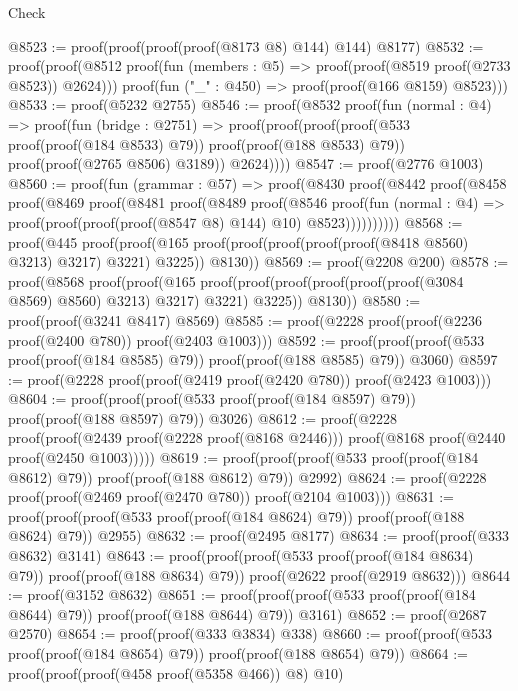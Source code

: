 \begin{lexlean}{Check}
\begin{coremodule}
@8523 := proof(proof(proof(proof(@8173 @8) @144) @144) @8177)
@8532 := proof(proof(@8512
        proof(fun (members : @5) => proof(proof(@8519 proof(@2733 @8523)) @2624)))
      proof(fun ("_" : @450) => proof(proof(@166 @8159) @8523)))
@8533 := proof(@5232 @2755)
@8546 := proof(@8532
      proof(fun (normal : @4) =>
        proof(fun (bridge : @2751) =>
          proof(proof(proof(proof(@533 proof(proof(@184 @8533) @79)) proof(proof(@188 @8533) @79))
                proof(proof(@2765 @8506) @3189))
              @2624))))
@8547 := proof(@2776 @1003)
@8560 := proof(fun (grammar : @57) =>
    proof(@8430
        proof(@8442
            proof(@8458
                proof(@8469
                    proof(@8481
                        proof(@8489
                            proof(@8546
                                proof(fun (normal : @4) =>
                                  proof(proof(proof(proof(@8547 @8) @144) @10) @8523))))))))))
@8568 := proof(@445
      proof(proof(@165 proof(proof(proof(proof(proof(@8418 @8560) @3213) @3217) @3221) @3225))
          @8130))
@8569 := proof(@2208 @200)
@8578 := proof(@8568
      proof(proof(@165
            proof(proof(proof(proof(proof(proof(@3084 @8569) @8560) @3213) @3217) @3221) @3225))
          @8130))
@8580 := proof(proof(@3241 @8417) @8569)
@8585 := proof(@2228 proof(proof(@2236 proof(@2400 @780)) proof(@2403 @1003)))
@8592 := proof(proof(proof(@533 proof(proof(@184 @8585) @79)) proof(proof(@188 @8585) @79)) @3060)
@8597 := proof(@2228 proof(proof(@2419 proof(@2420 @780)) proof(@2423 @1003)))
@8604 := proof(proof(proof(@533 proof(proof(@184 @8597) @79)) proof(proof(@188 @8597) @79)) @3026)
@8612 := proof(@2228
      proof(proof(@2439 proof(@2228 proof(@8168 @2446)))
          proof(@8168 proof(@2440 proof(@2450 @1003)))))
@8619 := proof(proof(proof(@533 proof(proof(@184 @8612) @79)) proof(proof(@188 @8612) @79)) @2992)
@8624 := proof(@2228 proof(proof(@2469 proof(@2470 @780)) proof(@2104 @1003)))
@8631 := proof(proof(proof(@533 proof(proof(@184 @8624) @79)) proof(proof(@188 @8624) @79)) @2955)
@8632 := proof(@2495 @8177)
@8634 := proof(proof(@333 @8632) @3141)
@8643 := proof(proof(proof(@533 proof(proof(@184 @8634) @79)) proof(proof(@188 @8634) @79))
      proof(@2622 proof(@2919 @8632)))
@8644 := proof(@3152 @8632)
@8651 := proof(proof(proof(@533 proof(proof(@184 @8644) @79)) proof(proof(@188 @8644) @79)) @3161)
@8652 := proof(@2687 @2570)
@8654 := proof(proof(@333 @3834) @338)
@8660 := proof(proof(@533 proof(proof(@184 @8654) @79)) proof(proof(@188 @8654) @79))
@8664 := proof(proof(proof(@458 proof(@5358 @466)) @8) @10)

\end{coremodule}
\end{lexlean}
